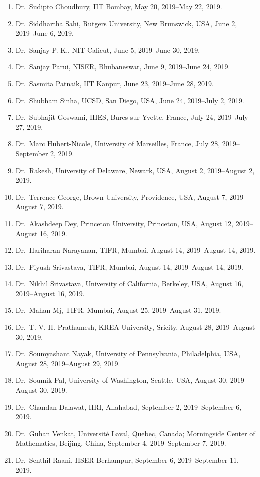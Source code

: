 \begin{enumerate}
\item Dr.~Sudipto Choudhury, IIT Bombay, May 20, 2019--May 22, 2019.
\item Dr.~Siddhartha Sahi, Rutgers University, New Brunswick, USA, June 2, 2019--June 6, 2019.
\item Dr.~Sanjay P. K., NIT Calicut, June 5, 2019--June 30, 2019.
\item Dr.~Sanjay Parui, NISER, Bhubaneswar, June 9, 2019--June 24, 2019.
\item Dr.~Sasmita Patnaik, IIT Kanpur, June 23, 2019--June 28, 2019.
\item Dr.~Shubham Sinha, UCSD, San Diego, USA, June 24, 2019--July 2, 2019.
\item Dr.~Subhajit Goswami, IHES, Bures-sur-Yvette, France, July 24, 2019--July 27, 2019.
\item Dr.~Marc Hubert-Nicole, University of Marseilles, France, July 28, 2019--September 2, 2019.
\item Dr.~Rakesh, University of Delaware, Newark, USA, August 2, 2019--August 2, 2019.
\item Dr.~Terrence George, Brown University, Providence, USA, August 7, 2019--August 7, 2019.
\item Dr.~Akashdeep Dey, Princeton University, Princeton, USA, August 12, 2019--August 16, 2019.
\item Dr.~Hariharan Narayanan, TIFR, Mumbai, August 14, 2019--August 14, 2019.
\item Dr.~Piyush Srivastava, TIFR, Mumbai, August 14, 2019--August 14, 2019.
\item Dr.~Nikhil Srivastava, University of California, Berkeley, USA, August 16, 2019--August 16, 2019.
\item Dr.~Mahan Mj, TIFR, Mumbai, August 25, 2019--August 31, 2019.
\item Dr.~T. V. H. Prathamesh, KREA University, Sricity, August 28, 2019--August 30, 2019.
\item Dr.~Soumyashant Nayak, University of Pennsylvania, Philadelphia, USA, August 28, 2019--August 29, 2019.
\item Dr.~Soumik Pal, University of Washington, Seattle, USA, August 30, 2019--August 30, 2019.
\item Dr.~Chandan Dalawat, HRI, Allahabad, September 2, 2019--September 6, 2019.
\item Dr.~Guhan Venkat, Université Laval, Quebec, Canada; Morningside Center of Mathematics, Beijing, China, September 4, 2019--September 7, 2019.
\item Dr.~Senthil Raani, IISER Berhampur, September 6, 2019--September 11, 2019.

\end{enumerate}

